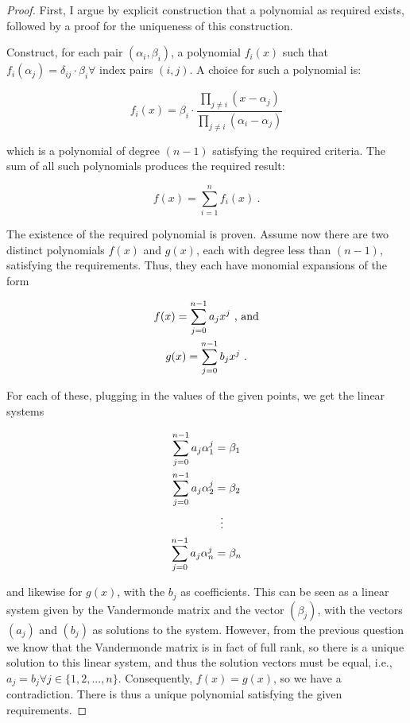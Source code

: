 \question

\begin{proof}
    First, I argue by explicit construction that a polynomial as required
    exists, followed by a proof for the uniqueness of this construction.
    
    Construct, for each pair \((\alpha_i, \beta_i)\), a polynomial \(f_i(x)\)
    such that \(f_i(\alpha_j) = \delta_{ij}\cdot \beta_i \forall \) index pairs
    \((i, j)\). A choice for such a polynomial is:
    
    \begin{equation}
        f_i(x) = \beta_i\cdot\displaystyle\frac{
            \prod_{j\not = i} (x-\alpha_j)
        }{
            \prod_{j\not = i} (\alpha_i-\alpha_j)
        }
    \end{equation}

    which is a polynomial of degree \((n-1)\) satisfying the required criteria.
    The sum of all such polynomials produces the required result:

    \begin{equation}
        f(x) = \sum_{i=1}^{n} f_i(x)~.
    \end{equation}

    The existence of the required polynomial is proven. Assume now there are two
    distinct polynomials \(f(x)\) and \(g(x)\), each with degree less than
    \((n-1)\), satisfying the requirements. Thus, they each have monomial
    expansions of the form

    \begin{gather}
        f(x) = \sum_{j=0}^{n-1} a_j x^j \textnormal{ , and}\\
        g(x) = \sum_{j=0}^{n-1} b_j x^j ~.
    \end{gather}

    For each of these, plugging in the values of the given points, we get the
    linear systems

    \begin{align*}
        \sum_{j=0}^{n-1} a_j \alpha_1^j &= \beta_1 \\
        \sum_{j=0}^{n-1} a_j \alpha_2^j &= \beta_2 \\
                                        &\;\;\vdots \notag \\
        \sum_{j=0}^{n-1} a_j \alpha_n^j &= \beta_n
    \end{align*}

    and likewise for \(g(x)\), with the \(b_j\) as coefficients. This can be
    seen as a linear system given by the Vandermonde matrix and the vector
    \((\beta_j)\), with the vectors \((a_j)\) and \((b_j)\) as solutions to the
    system. However, from the previous question we know that the Vandermonde
    matrix is in fact of full rank, so there is a unique solution to this linear
    system, and thus the solution vectors must be equal, i.e., \(a_j = b_j
    \forall j \in \{1, 2, ..., n\}\). Consequently, \(f(x) = g(x)\), so we have
    a contradiction. There is thus a unique polynomial satisfying the given
    requirements.
\end{proof}